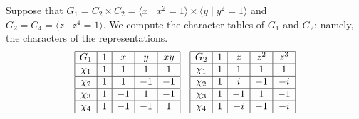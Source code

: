 \begin{exmp}
    Suppose that $G_1 = C_2 \times C_2 = \langle x \mid x^2 = 1 \rangle 
    \times \langle y \mid y^2 = 1 \rangle$ and $G_2 = C_4 = \langle z \mid 
    z^4 = 1 \rangle$. We compute the character tables of $G_1$ and $G_2$; 
    namely, the characters of the representations. 
    \begin{align*}
        \begin{array}{|c|c|c|c|c|}
            \hline
            G_1    & 1 & x  & y  & xy \\ \hline
            \chi_1 & 1 & 1  & 1  & 1  \\ \hline
            \chi_2 & 1 & 1  & -1 & -1 \\ \hline
            \chi_3 & 1 & -1 & 1  & -1 \\ \hline
            \chi_4 & 1 & -1 & -1 & 1  \\ \hline
        \end{array} & & 
        \begin{array}{|c|c|c|c|c|}
            \hline
            G_2    & 1 & z  & z^2  & z^3 \\ \hline
            \chi_1 & 1 & 1  & 1    & 1  \\ \hline
            \chi_2 & 1 & i  & -1   & -i \\ \hline
            \chi_3 & 1 & -1 & 1    & -1 \\ \hline
            \chi_4 & 1 & -i & -1   & -i  \\ \hline
        \end{array} 
    \end{align*}
\end{exmp}

